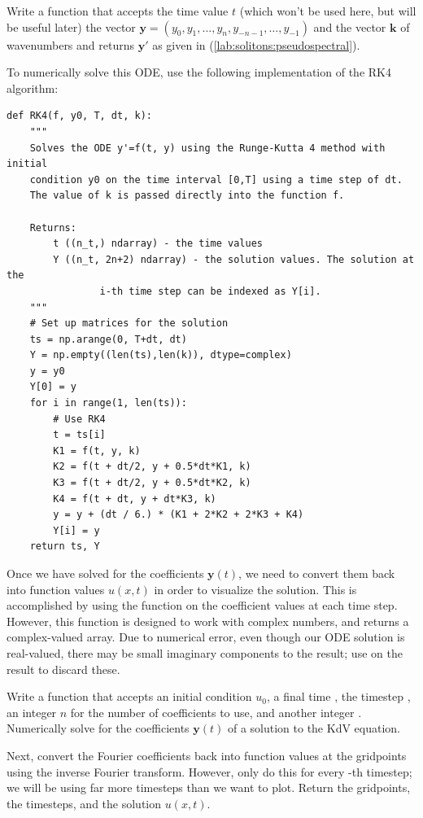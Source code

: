 \begin{problem}
Write a function that accepts the time value \(t\) (which won't be used here, but will be useful later) the vector \(\mathbf{y}=(y_0,y_1,\ldots,y_n,y_{-n-1},\ldots,y_{-1})\) and the vector \(\mathbf{k}\) of wavenumbers and returns \(\mathbf{y}'\) as given in (\ref{lab:solitons:pseudospectral}).

\end{problem}

\noindent
To numerically solve this ODE, use the following implementation of the RK4 algorithm:
\begin{lstlisting}
def RK4(f, y0, T, dt, k):
    """
    Solves the ODE y'=f(t, y) using the Runge-Kutta 4 method with initial 
    condition y0 on the time interval [0,T] using a time step of dt.
    The value of k is passed directly into the function f.
    
    Returns:
        t ((n_t,) ndarray) - the time values
        Y ((n_t, 2n+2) ndarray) - the solution values. The solution at the 
                i-th time step can be indexed as Y[i].
    """
    # Set up matrices for the solution
    ts = np.arange(0, T+dt, dt)
    Y = np.empty((len(ts),len(k)), dtype=complex)
    y = y0
    Y[0] = y
    for i in range(1, len(ts)):
        # Use RK4
        t = ts[i]
        K1 = f(t, y, k)
        K2 = f(t + dt/2, y + 0.5*dt*K1, k)
        K3 = f(t + dt/2, y + 0.5*dt*K2, k)
        K4 = f(t + dt, y + dt*K3, k)
        y = y + (dt / 6.) * (K1 + 2*K2 + 2*K3 + K4)
        Y[i] = y
    return ts, Y
\end{lstlisting}

Once we have solved for the coefficients \(\mathbf{y}(t)\), we need to convert them back into function values \(u(x,t)\) in order to visualize the solution.
This is accomplished by using the  function on the coefficient values at each time step.
However, this function is designed to work with complex numbers, and returns a complex-valued array.
Due to numerical error, even though our ODE solution is real-valued, there may be small imaginary components to the result; use  on the result to discard these.

\begin{problem}
Write a function that accepts an initial condition \(u_0\), a final time , the timestep , an integer \(n\) for the number of coefficients to use, and another integer .
Numerically solve for the coefficients \(\mathbf{y}(t)\) of a solution to the KdV equation.

Next, convert the Fourier coefficients back into function values at the gridpoints using the inverse Fourier transform.
However, only do this for every -th timestep; we will be using far more timesteps than we want to plot.
Return the gridpoints, the timesteps, and the solution \(u(x,t)\).
\end{problem}


